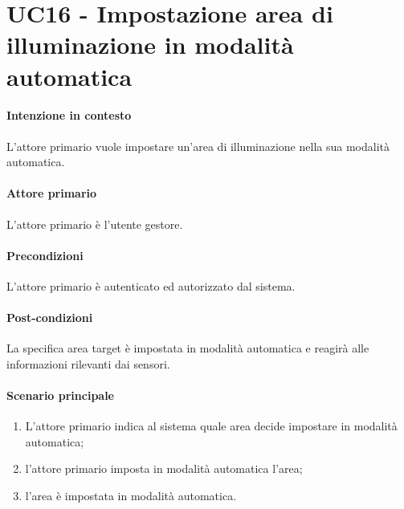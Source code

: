 \section{UC16 - Impostazione area di illuminazione in modalità automatica}\label{uc:16}
\paragraph{Intenzione in contesto} L'attore primario vuole impostare un'area di illuminazione nella sua modalità automatica.
\paragraph{Attore primario} L'attore primario è l'utente gestore.
\paragraph{Precondizioni}  L'attore primario è autenticato ed autorizzato dal sistema.
\paragraph{Post-condizioni} La specifica area target è impostata in modalità automatica e reagirà alle informazioni rilevanti dai sensori.
\paragraph{Scenario principale}
\begin{enumerate}
    \item L'attore primario indica al sistema quale area decide impostare in modalità automatica;
    \item l'attore primario imposta in modalità automatica l'area;
    \item l'area è impostata in modalità automatica.
\end{enumerate}